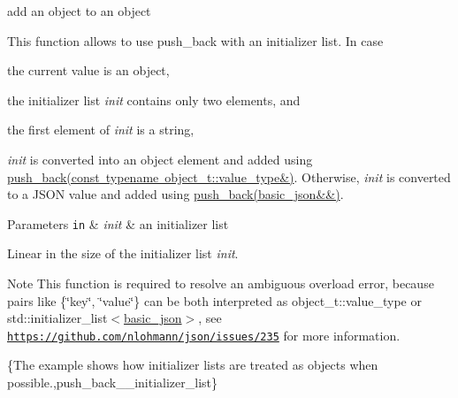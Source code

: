 add an object to an object 

This function allows to use {\ttfamily push\+\_\+back} with an initializer list. In case


\begin{DoxyEnumerate}
\item the current value is an object,
\item the initializer list {\itshape init} contains only two elements, and
\item the first element of {\itshape init} is a string,
\end{DoxyEnumerate}

{\itshape init} is converted into an object element and added using \mbox{\hyperlink{classnlohmann_1_1basic__json_ae11a3a51782c058fff2f6550cdfb9b3c}{push\+\_\+back(const typename object\+\_\+t\+::value\+\_\+type\&)}}. Otherwise, {\itshape init} is converted to a J\+S\+ON value and added using \mbox{\hyperlink{classnlohmann_1_1basic__json_ac8e523ddc8c2dd7e5d2daf0d49a9c0d7}{push\+\_\+back(basic\+\_\+json\&\&)}}.


\begin{DoxyParams}[1]{Parameters}
\mbox{\tt in}  & {\em init} & an initializer list\\
\hline
\end{DoxyParams}
Linear in the size of the initializer list {\itshape init}.

\begin{DoxyNote}{Note}
This function is required to resolve an ambiguous overload error, because pairs like {\ttfamily \{\char`\"{}key\char`\"{}, \char`\"{}value\char`\"{}\}} can be both interpreted as {\ttfamily object\+\_\+t\+::value\+\_\+type} or {\ttfamily std\+::initializer\+\_\+list$<$\mbox{\hyperlink{classnlohmann_1_1basic__json}{basic\+\_\+json}}$>$}, see \href{https://github.com/nlohmann/json/issues/235}{\tt https\+://github.\+com/nlohmann/json/issues/235} for more information.
\end{DoxyNote}
\{The example shows how initializer lists are treated as objects when possible.,push\+\_\+back\+\_\+\+\_\+initializer\+\_\+list\} \mbox{\label{classnlohmann_1_1basic__json_a1ef93e2006dbe52667294f5ef38b0b10}} 

